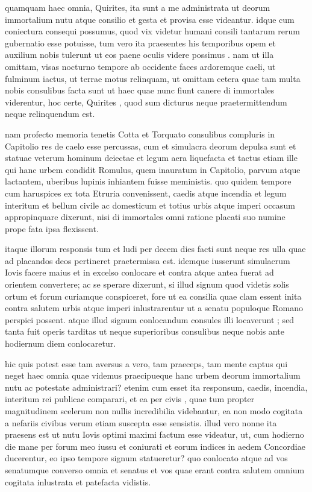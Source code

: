  quamquam haec omnia, Quirites, ita sunt a me administrata ut deorum immortalium nutu atque consilio et gesta et provisa esse videantur. idque cum coniectura consequi possumus, quod vix videtur humani consili tantarum rerum gubernatio esse potuisse, tum vero ita praesentes his temporibus opem et auxilium nobis tulerunt ut eos paene oculis videre possimus . nam ut illa omittam, visas nocturno tempore ab occidente faces ardoremque caeli, ut fulminum iactus, ut terrae motus relinquam, ut omittam cetera quae tam multa nobis consulibus facta sunt ut haec quae nunc fiunt canere di immortales viderentur, hoc certe, Quirites , quod sum dicturus neque praetermittendum neque relinquendum est.

 nam profecto memoria tenetis Cotta et Torquato consulibus compluris in Capitolio res de caelo esse percussas, cum et simulacra deorum depulsa sunt et statuae veterum hominum deiectae et legum aera liquefacta et tactus etiam ille qui hanc urbem condidit Romulus, quem inauratum in Capitolio, parvum atque lactantem, uberibus lupinis inhiantem fuisse meministis. quo quidem tempore cum haruspices ex tota Etruria convenissent, caedis atque incendia et legum interitum et bellum civile ac domesticum et totius urbis atque imperi occasum appropinquare dixerunt, nisi di immortales omni ratione placati suo numine prope fata ipsa flexissent.

 itaque illorum responsis tum et ludi per decem dies facti sunt neque res ulla quae ad placandos deos pertineret praetermissa est. idemque iusserunt simulacrum Iovis facere maius et in excelso conlocare et contra atque antea fuerat ad orientem convertere; ac se sperare dixerunt, si illud signum quod videtis solis ortum et forum curiamque conspiceret, fore ut ea consilia quae clam essent inita contra salutem urbis atque imperi inlustrarentur ut a senatu populoque Romano perspici possent. atque illud signum conlocandum consules illi locaverunt ; sed tanta fuit operis tarditas ut neque superioribus consulibus neque nobis ante hodiernum diem conlocaretur.

 hic quis potest esse tam aversus a vero, tam praeceps, tam mente captus qui neget haec omnia quae videmus praecipueque hanc urbem deorum immortalium nutu ac potestate administrari? etenim cum esset ita responsum, caedis, incendia, interitum rei publicae comparari, et ea per civis , quae tum propter magnitudinem scelerum non nullis incredibilia videbantur, ea non modo cogitata a nefariis civibus verum etiam suscepta esse sensistis. illud vero nonne ita praesens est ut nutu Iovis optimi maximi factum esse videatur, ut, cum hodierno die mane per forum meo iussu et coniurati et eorum indices in aedem Concordiae ducerentur, eo ipso tempore signum statueretur? quo conlocato atque ad vos senatumque converso omnia et senatus et vos quae erant contra salutem omnium cogitata inlustrata et patefacta vidistis.

